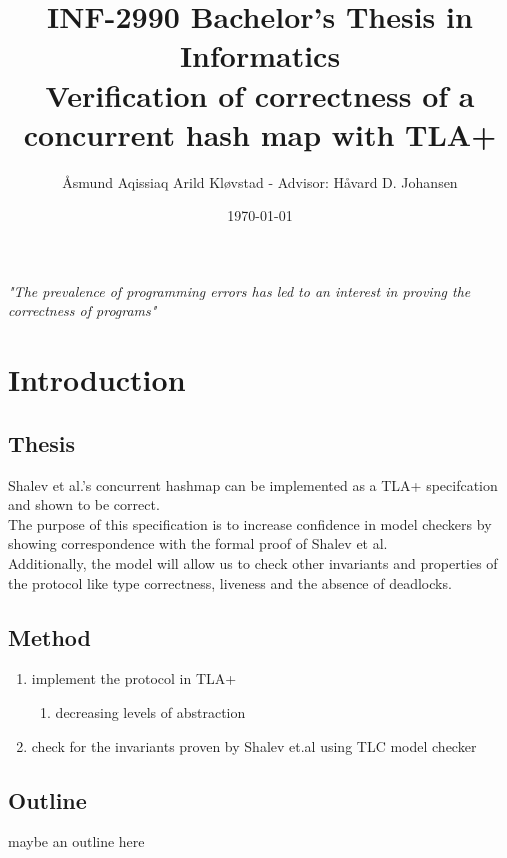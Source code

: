 \documentclass[journal]{IEEEtran}
\begin{document}
\title{{\large INF-2990 Bachelor's Thesis in Informatics} \\ 
{\LARGE Verification of correctness of a concurrent hash map with TLA+}}


\author{Åsmund Aqissiaq Arild Kløvstad - Advisor: Håvard D. Johansen}
\date{\today}

\maketitle



\IEEEpeerreviewmaketitle

\textit{"The prevalence of programming errors has led to an interest in proving the correctness of programs"}

\section{Introduction}


\subsection{Thesis}
Shalev et al.'s concurrent hashmap can be implemented as a TLA+ specifcation and shown to be correct.
\\
The purpose of this specification is to increase confidence in model checkers by showing correspondence with the formal proof of Shalev et al.
\\
Additionally, the model will allow us to check other invariants and properties of the protocol like type correctness, liveness and the absence of deadlocks.
\subsection{Method}
\begin{enumerate}
    \item implement the protocol in TLA+
    \begin{enumerate}
        \item decreasing levels of abstraction
    \end{enumerate}
    \item check for the invariants proven by Shalev et.al using TLC model checker
\end{enumerate}

\subsection{Outline}
maybe an outline here
\end{document}
